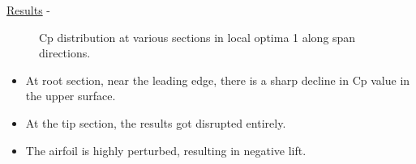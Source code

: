 \begin{frame}[allowframebreaks]{\underline{Results} -}
\begin{figure}
{    
    }
    \caption{Cp distribution at various sections in local optima 1 along span directions.}
    \label{cp_curve in span direction}
\end{figure}
\begin{itemize}
\item At root section, near the leading edge, there is a
sharp decline in Cp value in the upper surface.
\item At the tip section, the results got disrupted entirely.
\item The airfoil is highly perturbed, resulting in negative lift.
\end{itemize}


\end{frame}
